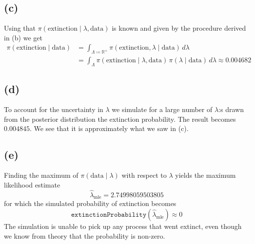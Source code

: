 \documentclass{article}
\begin{document}
\subsection{(c)}
Using that $\pi(\text{extinction} \mid \lambda, \text{data})$ is known
and given by the procedure derived in (b) we get
\begin{align*}
	\pi(\text{extinction} \mid \text{data}) &= \int_{\Lambda \coloneqq \mathbb R^+} \pi(\text{extinction}, \lambda \mid \text{data}) \, d\lambda \\
		&= \int_\Lambda \pi(\text{extinction} \mid \lambda, \text{data}) \, \pi(\lambda \mid \text{data}) \, d\lambda
		\approx 0.004682
\end{align*}

\subsection{(d)}
To account for the uncertainty in $\lambda$ we simulate for
a large number of $\lambda$:s drawn from the posterior distribution
the extinction probability.
The result becomes $0.004845$.
We see that it is approximately what we saw in (c).

\subsection{(e)}
Finding the maximum of $\pi(\text{data} \mid \lambda)$ with respect to $\lambda$
yields the maximum likelihood estimate
$$ \hat\lambda_\text{mle} = \num{2.74998059503805} $$
for which the simulated probability of extinction becomes
$$ \texttt{extinctionProbability}(\hat\lambda_\text{mle}) \approx 0 $$
The simulation is unable to pick up any process that went extinct,
even though we know from theory that the probability is non-zero.
\end{document}
